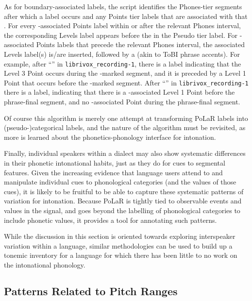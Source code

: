 \begin{infobox}[frametitle=\textbf{Generating “Pseudo-Categorical” Labels from PoLaR Labels}]
	As for boundary-associated labels, the script identifies the Phones-tier segments after which a \textlabel{]} label occurs and any Points tier labels that are associated with that \textlabel{]}. For every \textlabel{]}-associated Points label within or after the relevant Phones interval, the corresponding Levels label appears before the \textlabel{\%} in the Pseudo tier label. For \textlabel{]}-associated Points labels that precede the relevant Phones interval, the associated Levels label(s) is/are inserted, followed by a \textlabel{-} (akin to ToBI phrase accents). For example, after “” in \texttt{librivox\_recording-1}, there is a  label indicating that the Level 3 Point occurs during the \textlabel{]}-marked segment, and it is preceded by a Level 1 Point that occurs before the \textlabel{]}-marked segment. After “” in \texttt{librivox\_recording-1} there is a  label, indicating that there is a \textlabel{]}-associated Level 1 Point before the phrase-final segment, and no \textlabel{]}-associated Point during the phrase-final segment.

	Of course this algorithm is merely one attempt at transforming PoLaR labels into (pseudo-)categorical labels, and the nature of the algorithm must be revisited, as more is learned about the phonetics-phonology interface for intonation.
\end{infobox}

Finally, individual speakers within a dialect may also show systematic differences in their phonetic intonational habits, just as they do for cues to segmental features.  Given the increasing evidence that language users attend to and manipulate individual cues to phonological categories (and the values of those cues), it is likely to be fruitful to be able to capture these systematic patterns of variation for intonation.  Because PoLaR is tightly tied to observable events and values in the signal, and goes beyond the labelling of phonological categories to include phonetic values, it provides a tool for annotating such patterns.

While the discussion in this section is oriented towards exploring interspeaker variation within a language, similar methodologies can be used to build up a tonemic inventory for a language for which there has been little to no work on the intonational phonology.

\subsection{Patterns Related to Pitch Ranges}\label{sec:pitch-ranges}

